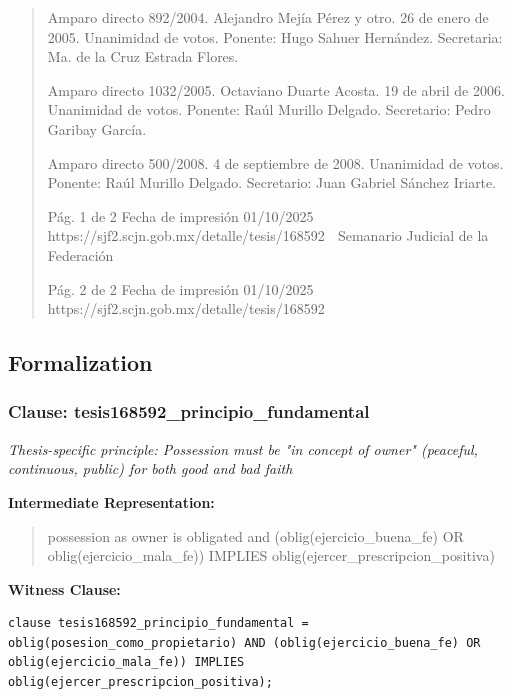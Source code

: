 \documentclass[11pt,a4paper]{article}
\begin{document}
\begin{quote}
Amparo directo 892/2004. Alejandro Mejía Pérez y otro. 26 de enero de 2005. Unanimidad de votos.
Ponente: Hugo Sahuer Hernández. Secretaria: Ma. de la Cruz Estrada Flores.

Amparo directo 1032/2005. Octaviano Duarte Acosta. 19 de abril de 2006. Unanimidad de votos.
Ponente: Raúl Murillo Delgado. Secretario: Pedro Garibay García.

Amparo directo 500/2008. 4 de septiembre de 2008. Unanimidad de votos. Ponente: Raúl Murillo
Delgado. Secretario: Juan Gabriel Sánchez Iriarte.




                                             Pág. 1 de 2             Fecha de impresión 01/10/2025
  https://sjf2.scjn.gob.mx/detalle/tesis/168592
                                                Semanario Judicial de la Federación




                                           Pág. 2 de 2       Fecha de impresión 01/10/2025
https://sjf2.scjn.gob.mx/detalle/tesis/168592

\end{quote}

\subsection{Formalization}

\subsubsection{Clause: tesis168592\_principio\_fundamental}

\textit{Thesis-specific principle: Possession must be "in concept of owner" (peaceful, continuous, public) for both good and bad faith}

\textbf{Intermediate Representation:}

\begin{quote}
possession as owner is obligated and (oblig(ejercicio\_buena\_fe) OR oblig(ejercicio\_mala\_fe)) IMPLIES oblig(ejercer\_prescripcion\_positiva)
\end{quote}

\textbf{Witness Clause:}

\begin{lstlisting}[style=witnessstyle, language=Witness]
clause tesis168592_principio_fundamental = oblig(posesion_como_propietario) AND (oblig(ejercicio_buena_fe) OR oblig(ejercicio_mala_fe)) IMPLIES oblig(ejercer_prescripcion_positiva);
\end{lstlisting}
\end{document}
